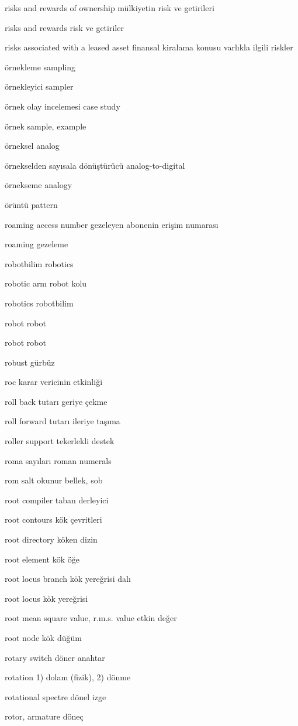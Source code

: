 \documentclass[12pt,fleqn]{article}\usepackage{../../common}
\begin{document}
risks and rewards of ownership mülkiyetin risk ve getirileri

risks and rewards risk ve getiriler

risks associated with a leased asset finansal kiralama konusu varlıkla ilgili riskler

örnekleme sampling

örnekleyici sampler

örnek olay incelemesi case study

örnek sample, example

örneksel analog

örnekselden sayısala dönüştürücü analog-to-digital

örnekseme analogy

örüntü pattern

roaming access number gezeleyen abonenin erişim numarası

roaming gezeleme

robotbilim robotics

robotic arm robot kolu

robotics robotbilim

robot robot

robot robot

robust gürbüz

roc karar vericinin etkinliği

roll back tutarı geriye çekme

roll forward tutarı ileriye taşıma

roller support tekerlekli destek

roma sayıları roman numerals

rom salt okunur bellek, sob

root compiler taban derleyici

root contours kök çevritleri

root directory köken dizin

root element kök öğe

root locus branch kök yereğrisi dalı

root locus kök yereğrisi

root mean square value, r.m.s. value etkin değer

root node kök düğüm

rotary switch döner anahtar

rotation 1) dolam (fizik), 2) dönme

rotational spectre dönel izge

rotor, armature döneç
\end{document}
